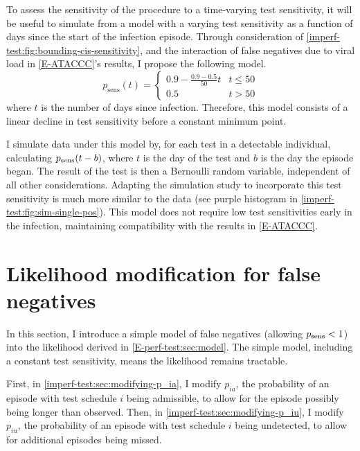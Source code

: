 \documentclass[thesis.tex]{subfiles}
\begin{document}
To assess the sensitivity of the procedure to a time-varying test sensitivity, it will be useful to simulate from a model with a varying test sensitivity as a function of days since the start of the infection episode.
Through consideration of \cref{imperf-test:fig:bounding-cis-sensitivity}, and the interaction of false negatives due to viral load in \cref{E-ATACCC}'s results, I propose the following model.
\begin{equation}
  p_\text{sens}(t) = \begin{cases}
    0.9 - \frac{0.9-0.5}{50}t &t \leq 50 \\
    0.5 &t > 50
  \end{cases}
  \label{imperf-test:eq:variable-test-sensitivity}
\end{equation}
where $t$ is the number of days since infection.
Therefore, this model consists of a linear decline in test sensitivity before a constant minimum point.

I simulate data under this model by, for each test in a detectable individual, calculating $p_\text{sens}(t-b)$, where $t$ is the day of the test and $b$ is the day the episode began.
The result of the test is then a Bernoulli random variable, independent of all other considerations.
Adapting the simulation study to incorporate this test sensitivity is much more similar to the data (see purple histogram in \cref{imperf-test:fig:sim-single-pos}).
This model does not require low test sensitivities early in the infection, maintaining compatibility with the results in \cref{E-ATACCC}.

\section{Likelihood modification for false negatives} \label{imperf-test:sec:modelling}

In this section, I introduce a simple model of false negatives (\ie allowing $p_\text{sens} < 1$) into the likelihood derived in \cref{E-perf-test:sec:model}.
The simple model, including a constant test sensitivity, means the likelihood remains tractable.

First, in \cref{imperf-test:sec:modifying-p_ia}, I modify $p_{ia}$, the probability of an episode with test schedule $i$ being admissible, to allow for the episode possibly being longer than observed.
Then, in \cref{imperf-test:sec:modifying-p_iu}, I modify $p_{iu}$, the probability of an episode with test schedule $i$ being undetected, to allow for additional episodes being missed.
\end{document}
